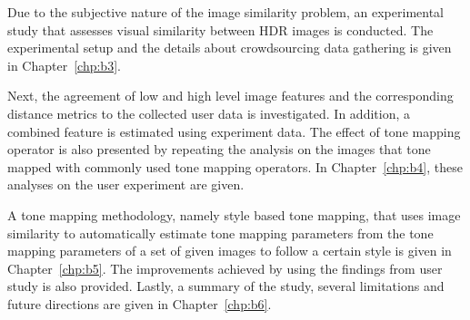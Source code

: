 Due to the subjective nature of the image similarity problem, an experimental study that assesses visual similarity between HDR images is conducted. The experimental setup and the details about crowdsourcing data gathering is given in Chapter~\ref{chp:b3}.

Next, the agreement of low and high level image features and the corresponding distance metrics to the collected user data is investigated. In addition, a combined feature is estimated using experiment data. The effect of tone mapping operator is also presented by repeating the analysis on the images that tone mapped with commonly used tone mapping operators. In Chapter~\ref{chp:b4}, these analyses on the user experiment are given.

A tone mapping methodology, namely style based tone mapping, that uses image similarity to automatically estimate tone mapping parameters from the tone mapping parameters of a set of given images to follow a certain style is given in Chapter~\ref{chp:b5}. The improvements achieved by using the findings from user study is also provided.
Lastly, a summary of the study, several limitations and future directions are given in Chapter~\ref{chp:b6}.






